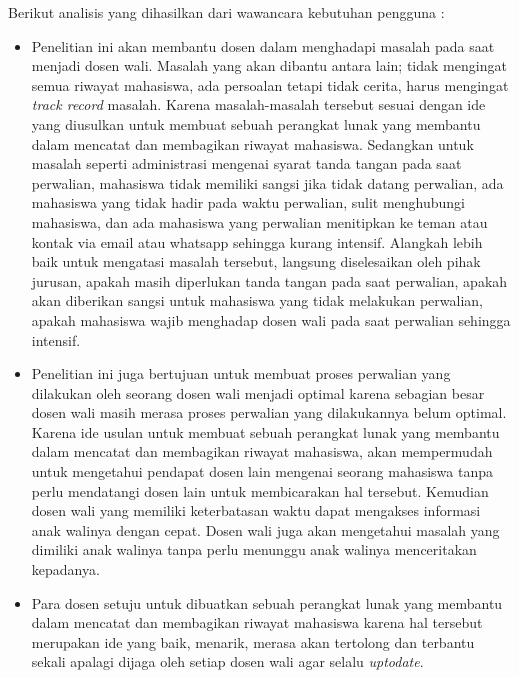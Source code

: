 Berikut analisis yang dihasilkan dari wawancara kebutuhan pengguna :
\begin{itemize}
\item Penelitian ini akan membantu dosen dalam menghadapi masalah pada saat menjadi dosen wali. Masalah yang akan dibantu antara lain; tidak mengingat semua riwayat mahasiswa, ada persoalan tetapi tidak cerita, harus mengingat {\it track record} masalah. Karena masalah-masalah tersebut sesuai dengan ide yang diusulkan untuk membuat sebuah perangkat lunak yang membantu dalam mencatat dan membagikan riwayat mahasiswa. Sedangkan untuk masalah seperti administrasi mengenai syarat tanda tangan pada saat perwalian, mahasiswa tidak memiliki sangsi jika tidak datang perwalian, ada mahasiswa yang tidak hadir pada waktu perwalian, sulit menghubungi mahasiswa, dan ada mahasiswa yang perwalian menitipkan ke teman atau kontak via email atau whatsapp sehingga kurang intensif. Alangkah lebih baik untuk mengatasi masalah tersebut, langsung diselesaikan oleh pihak jurusan, apakah masih diperlukan tanda tangan pada saat perwalian, apakah akan diberikan sangsi untuk mahasiswa yang tidak melakukan perwalian, apakah mahasiswa wajib menghadap dosen wali pada saat perwalian sehingga intensif.
\item Penelitian ini juga bertujuan untuk membuat proses perwalian yang dilakukan oleh seorang dosen wali menjadi optimal karena sebagian besar dosen wali masih merasa proses perwalian yang dilakukannya belum optimal. Karena ide usulan untuk membuat sebuah perangkat lunak yang membantu dalam mencatat dan membagikan riwayat mahasiswa, akan mempermudah untuk mengetahui pendapat dosen lain mengenai seorang mahasiswa tanpa perlu mendatangi dosen lain untuk membicarakan hal tersebut. Kemudian dosen wali yang memiliki keterbatasan waktu dapat mengakses informasi anak walinya dengan cepat. Dosen wali juga akan mengetahui masalah yang dimiliki anak walinya tanpa perlu menunggu anak walinya menceritakan kepadanya.
\item Para dosen setuju untuk dibuatkan sebuah perangkat lunak yang membantu dalam mencatat dan membagikan riwayat mahasiswa karena hal tersebut merupakan ide yang baik, menarik, merasa akan tertolong dan terbantu sekali apalagi dijaga oleh setiap dosen wali agar selalu {\it uptodate}.

\end{itemize}

